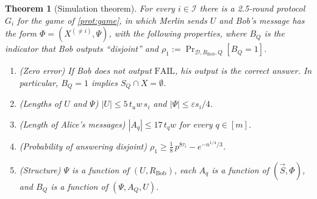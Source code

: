 \documentclass[11pt]{article}
\theoremstyle{plain}
\newtheorem{theorem}{Theorem}[section]
\theoremstyle{definition}
\theoremstyle{remark}
\newcommand{\eps}{\varepsilon}
\newcommand{\abs}[1]{\left|#1\right|}
\newcommand{\cI}{\mathcal{I}}
\newcommand{\cD}{\mathcal{D}}
\newcommand{\vS}{\vec{S}}
\begin{document}
\begin{theorem}[Simulation theorem]\label{thm:too-good}
For every $i \in \cI$ there is a 2.5-round protocol $G_i$ for the game of \cref{prot:game}, in which Merlin sends $U$ and Bob's message has the form $\Phi = (X^{(\ne i)}, \Psi)$, with the following properties, where $B_Q$ is the indicator that Bob outputs ``disjoint'' and $\rho_1 := \Pr_{\cD, R_{\mathrm{Bob}}, Q}[B_Q = 1]$.
\begin{enumerate}[label=(\alph*)]
  \item \emph{(Zero error)} If Bob does not output $\mathrm{FAIL}$, his output is the correct answer. In particular, $B_Q = 1$ implies $S_Q \cap X = \emptyset$.
  \item \emph{(Lengths of $U$ and $\Psi$)} $\abs{U} \le 5\, t_u w\, s_i$ and $\abs{\Psi} \le \eps s_i/4$.
  \item \emph{(Length of Alice's messages)} $\abs{A_q} \le 17\, t_q w$ for every $q \in [m]$.
  \item \emph{(Probability of answering disjoint)} $\rho_1 \ge \frac18\, p^{8\tau_i} - e^{-n^{1/4}/3}$.
  \item \emph{(Structure)} $\Psi$ is a function of $(U, R_{\mathrm{Bob}})$, each $A_q$ is a function of $(\vS, \Phi)$, and $B_Q$ is a function of $(\Psi, A_Q, U)$.
\end{enumerate}
\end{theorem}
\end{document}
